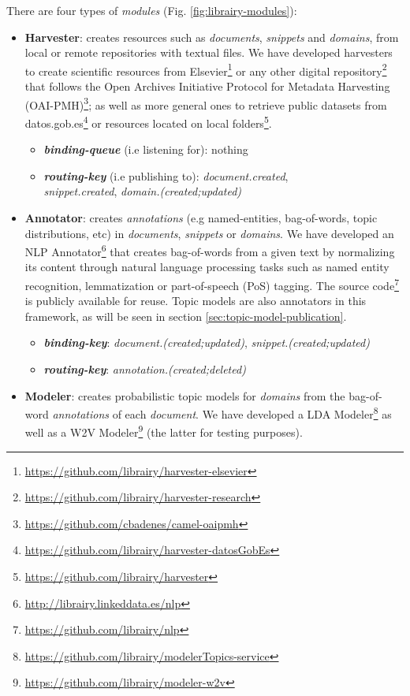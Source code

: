 There are four types of \textit{modules} (Fig. \ref{fig:librairy-modules}):
\begin{itemize}
	\item \textbf{Harvester}: creates resources such as \textit{documents}, \textit{snippets} and \textit{domains}, from local or remote repositories with textual files. We have developed harvesters to create scientific resources from Elsevier\footnote{\url{https://github.com/librairy/harvester-elsevier}} or any other digital repository\footnote{\url{https://github.com/librairy/harvester-research}} that follows the Open Archives Initiative Protocol for Metadata Harvesting (OAI-PMH)\footnote{\url{https://github.com/cbadenes/camel-oaipmh}}; as well as more general ones to retrieve public datasets from datos.gob.es\footnote{\url{https://github.com/librairy/harvester-datosGobEs}} or resources located on local folders\footnote{\url{https://github.com/librairy/harvester}}.
    \begin{itemize}
    		\item \textbf{\textit{binding-queue}} (i.e listening for): nothing
		\item \textbf{\textit{routing-key}} (i.e publishing to): \textit{document.created}, \\ \textit{snippet.created}, \textit{domain.(created;updated)}
    \end{itemize}
    \item \textbf{Annotator}: creates \textit{annotations} (e.g named-entities, bag-of-words, topic distributions, etc) in \textit{documents}, \textit{snippets} or \textit{domains}. We have developed an NLP Annotator\footnote{\url{http://librairy.linkeddata.es/nlp}} that creates bag-of-words from a given text by normalizing its content through natural language processing tasks such as named entity recognition, lemmatization or part-of-speech (PoS) tagging. The source code\footnote{\url{https://github.com/librairy/nlp}} is publicly available for reuse. Topic models are also annotators in this framework, as will be seen in section \ref{sec:topic-model-publication}.
    \begin{itemize}
    	\item \textbf{\textit{binding-key}}: \textit{document.(created;updated)}, \textit{snippet.(created;updated)}
	\item \textbf{\textit{routing-key}}: \textit{annotation.(created;deleted)}
    \end{itemize}
    \item \textbf{Modeler}: creates probabilistic topic models for \textit{domains} from the bag-of-word \textit{annotations} of each \textit{document}. We have developed a LDA Modeler\footnote{\url{https://github.com/librairy/modelerTopics-service}} as well as a W2V Modeler\footnote{\url{https://github.com/librairy/modeler-w2v}} (the latter for testing purposes). 

\end{itemize}
